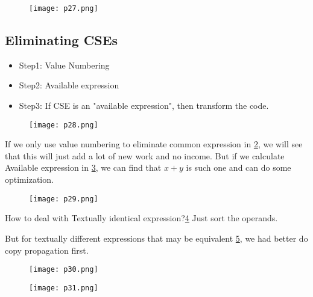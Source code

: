 \begin{figure}[h]
    \centering
    \texttt{[image: p27.png]}
    \caption{}
    \label{fig:p27}
\end{figure}


\subsection{Eliminating CSEs}


\begin{itemize}
    \item Step1: Value Numbering
    \item Step2: Available expression
    \item Step3: If CSE is an "available expression", then transform the code.
    
\end{itemize}

\begin{figure}[h]
    \centering
    \texttt{[image: p28.png]}
    \caption{}
    \label{fig:p28}
\end{figure}

If we only use value numbering to eliminate common expression in \ref{fig:p28}, we will see that this will just add a lot of new work and no income. But if we calculate Available expression in \ref{fig:p29}, we can find that $x+y$ is such one and can do some optimization.


\begin{figure}[h]
    \centering
    \texttt{[image: p29.png]}
    \caption{}
    \label{fig:p29}
\end{figure}

\begin{note}{How to deal with Textually identical expression?\ref{fig:p30}}
Just sort the operands.



But for textually different expressions that may be equivalent \ref{fig:p31}, we had better do copy propagation first.

\end{note}
\begin{figure}[h]
    \centering
    \texttt{[image: p30.png]}
    \caption{}
    \label{fig:p30}
\end{figure}

\begin{figure}[h]
    \centering
    \texttt{[image: p31.png]}
    \caption{}
    \label{fig:p31}
\end{figure}


